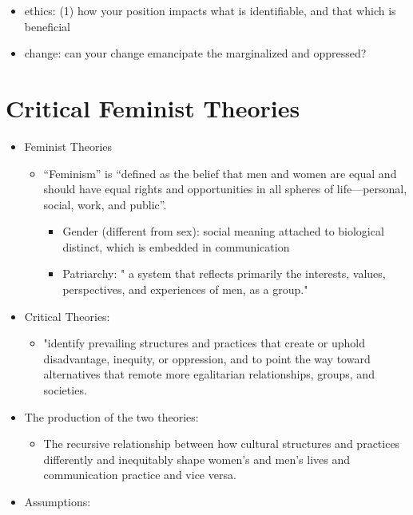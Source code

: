\documentclass[
]{book}
\providecommand{\tightlist}{%
  \setlength{\itemsep}{0pt}\setlength{\parskip}{0pt}}
\begin{document}
\begin{itemize}
\tightlist
\item
  ethics: (1) how your position impacts what is identifiable, and that which is beneficial
\item
  change: can your change emancipate the marginalized and oppressed?
\end{itemize}

\hypertarget{critical-feminist-theories}{%
\section{Critical Feminist Theories}\label{critical-feminist-theories}}

\begin{itemize}
\item
  Feminist Theories

  \begin{itemize}
  \item
    ``Feminism'' is ``defined as the belief that men and women are equal and should have equal rights and
    opportunities in all spheres of life---personal, social, work, and public''. \citep[pp.~290]{Baxter_2008}

    \begin{itemize}
    \item
      Gender (different from sex): social meaning attached to biological distinct, which is embedded in
      communication
    \item
      Patriarchy: " a system that reflects primarily the interests, values, perspectives, and experiences of men,
      as a group." \citep[pp.~290]{Baxter_2008}
    \end{itemize}
  \end{itemize}
\item
  Critical Theories:

  \begin{itemize}
  \tightlist
  \item
    "identify prevailing structures and practices that create or uphold disadvantage, inequity, or oppression, and
    to point the way toward alternatives that remote more egalitarian relationships, groups, and societies.
    \citep[pp.~292]{Baxter_2008}
  \end{itemize}
\item
  The production of the two theories:

  \begin{itemize}
  \tightlist
  \item
    The recursive relationship between how cultural structures and practices differently and inequitably shape
    women's and men's lives and communication practice and vice versa.
  \end{itemize}
\item
  Assumptions:


\end{itemize}
\end{document}

